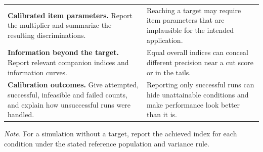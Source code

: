 \begin{table}[!htb]
\begin{tabularx}{\textwidth}{@{}>{\raggedright\arraybackslash}p{}>{\raggedright\arraybackslash}X@{}}
\addlinespace[4pt]
\textbf{Calibrated item parameters.} Report the multiplier and summarize the resulting discriminations. & Reaching a target may require item parameters that are implausible for the intended application. \\
\addlinespace[4pt]
\textbf{Information beyond the target.} Report relevant companion indices and information curves. & Equal overall indices can conceal different precision near a cut score or in the tails. \\
\addlinespace[4pt]
\textbf{Calibration outcomes.} Give attempted, successful, infeasible and failed counts, and explain how unsuccessful runs were handled. & Reporting only successful runs can hide unattainable conditions and make performance look better than it is. \\
\bottomrule
\end{tabularx}

\smallskip
\begin{minipage}{\textwidth}
\footnotesize
\emph{Note.} For a simulation without a target, report the achieved index for each condition under the stated reference population and variance rule.
\end{minipage}
\end{table}
